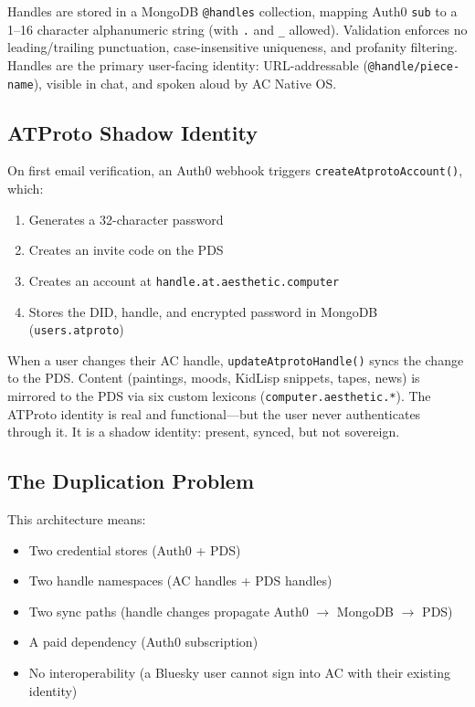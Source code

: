 \documentclass[10pt,letterpaper,twocolumn]{article}
\begin{document}
Handles are stored in a MongoDB \texttt{@handles} collection, mapping Auth0 \texttt{sub} to a 1--16 character alphanumeric string (with \texttt{.} and \texttt{\_} allowed). Validation enforces no leading/trailing punctuation, case-insensitive uniqueness, and profanity filtering. Handles are the primary user-facing identity: URL-addressable (\texttt{@handle/piece-name}), visible in chat, and spoken aloud by AC Native OS.

\subsection{ATProto Shadow Identity}

On first email verification, an Auth0 webhook triggers \texttt{createAtprotoAccount()}, which:

\begin{enumerate}
  \item Generates a 32-character password
  \item Creates an invite code on the PDS
  \item Creates an account at \texttt{handle.at.aesthetic.computer}
  \item Stores the DID, handle, and encrypted password in MongoDB (\texttt{users.atproto})
\end{enumerate}

When a user changes their AC handle, \texttt{updateAtprotoHandle()} syncs the change to the PDS. Content (paintings, moods, KidLisp snippets, tapes, news) is mirrored to the PDS via six custom lexicons (\texttt{computer.aesthetic.*}). The ATProto identity is real and functional---but the user never authenticates through it. It is a shadow identity: present, synced, but not sovereign.

\subsection{The Duplication Problem}

This architecture means:

\begin{itemize}
  \item Two credential stores (Auth0 + PDS)
  \item Two handle namespaces (AC handles + PDS handles)
  \item Two sync paths (handle changes propagate Auth0 $\to$ MongoDB $\to$ PDS)
  \item A paid dependency (Auth0 subscription)
  \item No interoperability (a Bluesky user cannot sign into AC with their existing identity)
\end{itemize}
\end{document}
